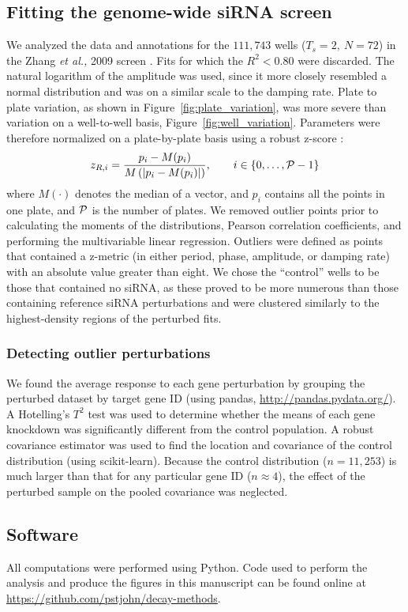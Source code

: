 \documentclass[11pt, letterpaper]{article}
\begin{document}
\subsection*{Fitting the genome-wide siRNA screen}
We analyzed the data and annotations for the $111,743$ wells ($T_s = 2,\ N = 72$) in the Zhang {\itshape et al.,} 2009 screen \cite{Zhang2009}.
Fits for which the $R^2 < 0.80$ were discarded.
The natural logarithm of the amplitude was used, since it more closely resembled a normal distribution and was on a similar scale to the damping rate.
Plate to plate variation, as shown in Figure~\ref{fig:plate_variation}, was more severe than variation on a well-to-well basis, Figure~\ref{fig:well_variation}.
Parameters were therefore normalized on a plate-by-plate basis using a robust z-score \cite{Birmingham2009}:
\[
  z_{R,i} = \frac{p_i - M(p_i)}{M\left(\left|p_i - M(p_i)\right|\right)}, \qquad i \in \{0, \dots, {\cal P} - 1 \}
\]
where $M(\cdot)$ denotes the median of a vector, and $p_i$ contains all the points in one plate, and $\cal P$ is the number of plates.
We removed outlier points prior to calculating the moments of the distributions, Pearson correlation coefficients, and performing the multivariable linear regression.
Outliers were defined as points that contained a z-metric (in either period, phase, amplitude, or damping rate) with an absolute value greater than eight.
We chose the ``control'' wells to be those that contained no siRNA, as these proved to be more numerous than those containing reference siRNA perturbations and were clustered similarly to the highest-density regions of the perturbed fits.

\subsubsection*{Detecting outlier perturbations}
We found the average response to each gene perturbation by grouping the perturbed dataset by target gene ID (using pandas, \url{http://pandas.pydata.org/}).
A Hotelling's $T^2$ test was used to determine whether the means of each gene knockdown was significantly different from the control population.
A robust covariance estimator was used to find the location and covariance of the control distribution (using scikit-learn).
Because the control distribution ($n=11,253$) is much larger than that for any particular gene ID ($n \approx 4$), the effect of the perturbed sample on the pooled covariance was neglected.

\subsection*{Software}
All computations were performed using Python.
Code used to perform the analysis and produce the figures in this manuscript can be found online at \url{https://github.com/pstjohn/decay-methods}.
\end{document}
